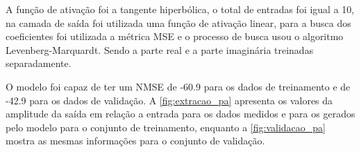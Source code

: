 A função de ativação foi a tangente hiperbólica, o total de entradas foi igual a 10, na camada de saída foi utilizada uma função de ativação linear, para a busca dos coeficientes foi utilizada a métrica MSE e o processo de busca usou o algoritmo Levenberg-Marquardt. Sendo a parte real e a parte imaginária treinadas separadamente.

O modelo foi capaz de ter um NMSE de -60.9 para os dados de treinamento e de -42.9 para os dados de validação. A \autoref{fig:extracao_pa} apresenta os valores da amplitude da saída em relação a entrada para os dados medidos e para os gerados pelo modelo para o conjunto de treinamento, enquanto a \autoref{fig:validacao_pa} mostra as mesmas informações para o conjunto de validação.



